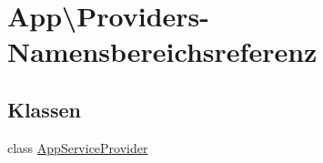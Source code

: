 \hypertarget{namespaceApp_1_1Providers}{}\section{App\textbackslash{}Providers-\/\+Namensbereichsreferenz}
\label{namespaceApp_1_1Providers}
\subsection*{Klassen}
\begin{DoxyCompactItemize}
\item 
class \hyperlink{classApp_1_1Providers_1_1AppServiceProvider}{App\+Service\+Provider}
\end{DoxyCompactItemize}
